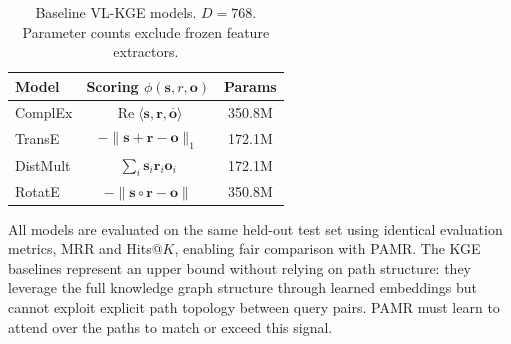 \begin{table}[t]
\centering
\caption{Baseline VL-KGE models.  $D = 768$. Parameter counts exclude frozen feature extractors.}
\label{tab:kge-models}
\begin{tabular}{lcc}
\toprule
\textbf{Model} & \textbf{Scoring $\phi(\mathbf{s}, r, \mathbf{o})$} & \textbf{Params} \\
\midrule
ComplEx & $\operatorname{Re}\langle \mathbf{s}, \mathbf{r}, \overline{\mathbf{o}} \rangle$
        & 350.8M \\
TransE  & $-\|\mathbf{s} + \mathbf{r} - \mathbf{o}\|_1$
        & 172.1M \\
DistMult & $\sum_i \mathbf{s}_i \mathbf{r}_i \mathbf{o}_i$
        & 172.1M \\
RotatE  & $-\|\mathbf{s} \circ \mathbf{r} - \mathbf{o}\|$
        & 350.8M \\
\bottomrule
\end{tabular}
\end{table}

All models are evaluated on the same held-out test set using identical evaluation
metrics, MRR and Hits@$K$, enabling fair comparison with PAMR.  The KGE baselines
represent an upper bound without relying on path structure: they leverage the full
knowledge graph structure through learned embeddings but cannot exploit explicit
path topology between query pairs.  PAMR must learn to attend over the paths to
match or exceed this signal.
